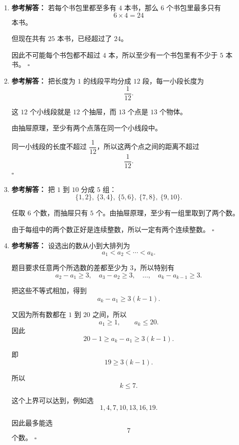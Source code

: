 \documentclass[11pt,a4paper,fontset=fandol]{ctexart}
\newenvironment{solution}{\par\noindent\textbf{参考解答：}}{\hfill$\square$\par}
\begin{document}
\begin{enumerate}
  \item \begin{solution}
  若每个书包里都至多有 $4$ 本书，那么 $6$ 个书包里最多只有
  \[
  6\times 4=24
  \]
  本书。

  但现在共有 $25$ 本书，已经超过了 $24$。

  因此不可能每个书包都不超过 $4$ 本，所以至少有一个书包里有不少于 $5$ 本书。
  \end{solution}

  \item \begin{solution}
  把长度为 $1$ 的线段平均分成 $12$ 段，每一小段长度为
  \[
  \frac{1}{12}.
  \]

  这 $12$ 个小线段就是 $12$ 个抽屉，而 $13$ 个点是 $13$ 个物体。

  由抽屉原理，至少有两个点落在同一个小线段中。

  同一小线段的长度不超过 $\dfrac{1}{12}$，所以这两个点之间的距离不超过
  \[
  \frac{1}{12}.
  \]
  \end{solution}

  \item \begin{solution}
  把 $1$ 到 $10$ 分成 $5$ 组：
  \[
  \{1,2\},\ \{3,4\},\ \{5,6\},\ \{7,8\},\ \{9,10\}.
  \]

  任取 $6$ 个数，而抽屉只有 $5$ 个。由抽屉原理，至少有一组里取到了两个数。

  由于每组中的两个数正好是连续整数，所以一定有两个连续整数。
  \end{solution}

  \item \begin{solution}
  设选出的数从小到大排列为
  \[
  a_1<a_2<\cdots<a_k.
  \]

  题目要求任意两个所选数的差都至少为 $3$，所以特别有
  \[
  a_2-a_1\ge 3,\quad a_3-a_2\ge 3,\quad \ldots,\quad a_k-a_{k-1}\ge 3.
  \]

  把这些不等式相加，得到
  \[
  a_k-a_1\ge 3(k-1).
  \]

  又因为所有数都在 $1$ 到 $20$ 之间，所以
  \[
  a_1\ge 1,\qquad a_k\le 20.
  \]
  因此
  \[
  20-1\ge a_k-a_1\ge 3(k-1).
  \]

  即
  \[
  19\ge 3(k-1).
  \]

  所以
  \[
  k\le 7.
  \]

  这个上界可以达到，例如选
  \[
  1,4,7,10,13,16,19.
  \]

  因此最多能选
  \[
  7
  \]
  个数。
  \end{solution}
\end{enumerate}
\end{document}
